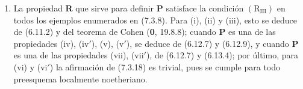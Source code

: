 \begin{remarks}[7.3.19]
\begin{enumerate}
\item[\textup{(i)}] La propiedad $\boldsymbol R$ que sirve para definir
$\boldsymbol P$ satisface la condición $(\mathrm R_{\mathrm{III}})$
en todos los ejemplos enumerados en (7.3.8). Para (i), (ii) y (iii),
esto se deduce de (6.11.2) y del teorema de Cohen (\textbf 0, 19.8.8);
cuando $\boldsymbol P$ es una de las propiedades (iv), (iv$'$), (v),
(v$'$), se deduce de (6.12.7) y (6.12.9), y cuando $\boldsymbol P$
es una de las propiedades (vii), (vii$'$), de (6.12.7) y (6.13.4);
por último, para (vi) y (vi$'$) la afirmación de (7.3.18) es trivial,
pues se cumple para todo preesquema localmente noetheriano.



\end{enumerate}
\end{remarks}
